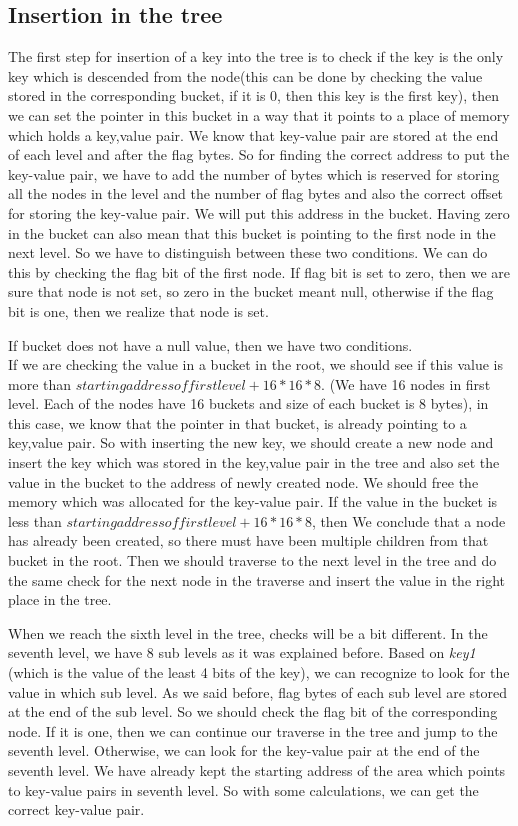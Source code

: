 \documentclass[12pt]{report}
\begin{document}
\subsection{Insertion in the tree}
 The first step for insertion of a key into the tree is to check if the key is the only key which is descended from the node(this can be done by checking the value stored in the corresponding bucket, if it is 0, then this key is the first key), then we can set the pointer in this bucket in a way that it points to a place of memory which holds a key,value pair. We know that key-value pair are stored at the end of each level and after the flag bytes. So for finding the correct address to put the key-value pair, we have to add the number of bytes which is reserved for storing all the nodes in the level and the number of flag bytes and also the correct offset for storing the key-value pair. We will put this address in the bucket. Having zero in the bucket can also mean that this bucket is pointing to the first node in the next level. So we have to distinguish between these two conditions. We can do this by checking the flag bit of the first node. If flag bit is set to zero, then we are sure that node is not set, so zero in the bucket meant null, otherwise if the flag bit is one, then we realize that node is set.
 
 If  bucket does not have a null value, then we have two conditions.\\
If we are checking the value in a bucket in the root, we should see if this value is more than $starting address of firstlevel+16*16*8$. (We have 16 nodes in first level. Each of the nodes have 16 buckets and size of each bucket is 8 bytes), in this case, we know that the pointer in that bucket, is already pointing to a key,value pair. So with inserting the new key, we should create a new node and insert the key which was stored in the key,value pair in the tree and also set the value in the bucket to the address of newly created node. We should free the memory which was allocated for the key-value pair. If the value in the bucket is less than $starting address of firstlevel+16*16*8$, then We conclude that a node has already been created, so there must have been multiple children from that bucket in the root. Then we should traverse to the next level in the tree and do the same check for the next node in the traverse and insert the value in the right place in the tree.

When we reach the sixth level in the tree, checks will be a bit different. In the seventh level, we have 8 sub levels as it was explained before. Based on \textit{key1} (which is the value of the least 4 bits of the key), we can recognize to look for the value in which sub level. As we said before, flag bytes of each sub level are stored at the end of the sub level. So we should check the flag bit of the corresponding node. If it is one, then we can continue our traverse in the tree and jump to the seventh level. Otherwise, we can look for the key-value pair at the end of the seventh level. We have already kept the starting address of the area which points to key-value pairs in seventh level. So with some calculations, we can get the correct key-value pair.          
\end{document}
